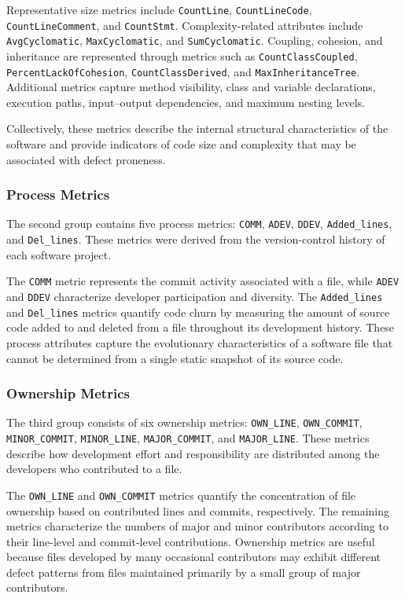 \documentclass[conference]{IEEEtran}
\begin{document}
Representative size metrics include \texttt{CountLine},
\texttt{CountLineCode}, \texttt{CountLineComment}, and
\texttt{CountStmt}. Complexity-related attributes include
\texttt{AvgCyclomatic}, \texttt{MaxCyclomatic}, and
\texttt{SumCyclomatic}. Coupling, cohesion, and inheritance are
represented through metrics such as \texttt{CountClassCoupled},
\texttt{PercentLackOfCohesion}, \texttt{CountClassDerived}, and
\texttt{MaxInheritanceTree}. Additional metrics capture method
visibility, class and variable declarations, execution paths,
input--output dependencies, and maximum nesting levels.

Collectively, these metrics describe the internal structural
characteristics of the software and provide indicators of code size
and complexity that may be associated with defect proneness.

\subsubsection{Process Metrics}

The second group contains five process metrics:
\texttt{COMM}, \texttt{ADEV}, \texttt{DDEV},
\texttt{Added\_lines}, and \texttt{Del\_lines}. These metrics were
derived from the version-control history of each software project.

The \texttt{COMM} metric represents the commit activity associated
with a file, while \texttt{ADEV} and \texttt{DDEV} characterize
developer participation and diversity. The \texttt{Added\_lines} and
\texttt{Del\_lines} metrics quantify code churn by measuring the
amount of source code added to and deleted from a file throughout its
development history. These process attributes capture the evolutionary
characteristics of a software file that cannot be determined from a
single static snapshot of its source code.

\subsubsection{Ownership Metrics}

The third group consists of six ownership metrics:
\texttt{OWN\_LINE}, \texttt{OWN\_COMMIT},
\texttt{MINOR\_COMMIT}, \texttt{MINOR\_LINE},
\texttt{MAJOR\_COMMIT}, and \texttt{MAJOR\_LINE}. These metrics
describe how development effort and responsibility are distributed
among the developers who contributed to a file.

The \texttt{OWN\_LINE} and \texttt{OWN\_COMMIT} metrics quantify the
concentration of file ownership based on contributed lines and commits,
respectively. The remaining metrics characterize the numbers of major
and minor contributors according to their line-level and commit-level
contributions. Ownership metrics are useful because files developed by
many occasional contributors may exhibit different defect patterns
from files maintained primarily by a small group of major contributors.
\end{document}
